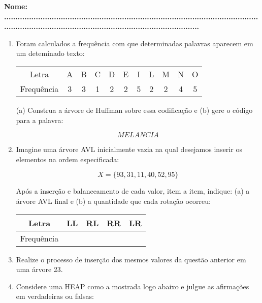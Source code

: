 \documentclass[11pt]{article}
\begin{document}
\large \textbf{Nome: \tiny ......................................................................................................................................................................................................}
\vfill
\begin{enumerate}[label=\textbf{Q\arabic*}]
    \item Foram calculados a frequência com que determinadas palavras aparecem em um deteminado texto:
          \begin{center}
              \begin{tabular}{c|cccccccccc}
                  \hline
                  Letra      & A & B & C & D & E & I & L & M & N & O \\
                  Frequência & 3 & 3 & 1 & 2 & 2 & 5 & 2 & 2 & 4 & 5 \\
                  \hline
              \end{tabular}
          \end{center}
          (a) Construa a árvore de Huffman sobre essa codificação e (b) gere o código para a palavra:

          $$MELANCIA$$

    \item Imagine uma árvore AVL inicialmente vazia na qual desejamos inserir os elementos na ordem especificada:\label{QAVL_1}

          $$X = \{93, 31, 11, 40, 52, 95\}$$

          Após a inserção e balanceamento de cada valor, item a item, indique: (a) a árvore AVL final e (b) a quantidade que cada rotação ocorreu:

          \begin{center}
              \begin{tabular}{|c|c|c|c|c|}
                  \hline
                  Letra      & LL & RL & RR & LR \\
                  \hline
                  Frequência & \  & \  & \  & \  \\
                  \hline
              \end{tabular}
          \end{center}

    \item Realize o processo de inserção dos mesmos valores da questão anterior em uma árvore 23.

    \item Considere uma HEAP como a mostrada logo abaixo e julgue as afirmações em verdadeiras ou falsas:


\end{enumerate}
\end{document}
